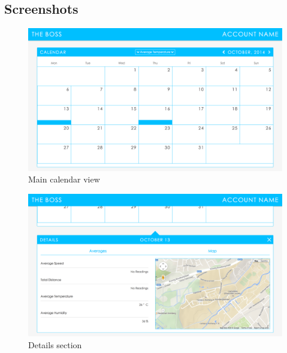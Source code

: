 \subsection{Screenshots}
\label{subsection:screenshots}
\begin{figure}[H]
\center
 \includegraphics[width=\linewidth]{attachments/screenshots/CalendarView.png}
 \caption{Main calendar view}
 \label{image:screenshot1}
\end{figure}
\begin{figure}[H]
\center
 \includegraphics[width=\linewidth]{attachments/screenshots/DetailsSection.png}
 \caption{Details section}
 \label{image:screenshot2}
\end{figure} 

